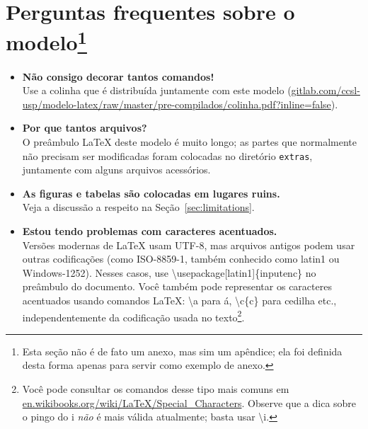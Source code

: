 
\chapter[Perguntas frequentes sobre o modelo]{Perguntas frequentes sobre o modelo\footnote{Esta
seção não é de fato um anexo, mas sim um apêndice; ela foi definida desta
forma apenas para servir como exemplo de anexo.}}

\begin{itemize}

\item \textbf{Não consigo decorar tantos comandos!}\\
Use a colinha que é distribuída juntamente com este modelo (\url{gitlab.com/ccsl-usp/modelo-latex/raw/master/pre-compilados/colinha.pdf?inline=false}).

\item \textbf{Por que tantos arquivos?}\\
O preâmbulo \LaTeX{} deste modelo é muito longo; as partes que normalmente não precisam ser modificadas foram colocadas no diretório \texttt{extras}, juntamente com alguns arquivos acessórios.

\item \textbf{As figuras e tabelas são colocadas em lugares ruins.}\\
Veja a discussão a respeito na Seção~\ref{sec:limitations}.

\item \textbf{Estou tendo problemas com caracteres acentuados.}\\
Versões modernas de \LaTeX{} usam UTF-8, mas arquivos antigos podem usar outras codificações (como ISO-8859-1, também conhecido como latin1 ou Windows-1252). Nesses casos, use \textsf{\textbackslash{}usepackage[latin1]\{inputenc\}} no preâmbulo do documento. Você também pode representar os caracteres acentuados usando comandos \LaTeX{}: \textsf{\textbackslash\textquotesingle{}a} para á, \textsf{\textbackslash{}c\{c\}} para cedilha etc., independentemente da codificação usada no texto\footnote{Você pode consultar os comandos desse tipo mais comuns em \url{en.wikibooks.org/wiki/LaTeX/Special_Characters}. Observe que a dica sobre o pingo do i \emph{não} é mais válida atualmente; basta usar \textsf{\textbackslash\textquotesingle{}i}.}.


\end{itemize}
